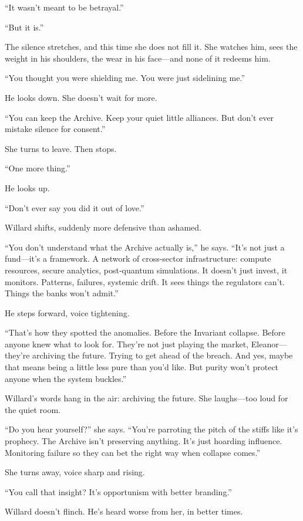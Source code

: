 “It wasn’t meant to be betrayal.”

“But it is.”

The silence stretches, and this time she does not fill it. She watches him, sees the weight in his shoulders, the wear in his face—and none of it redeems him.

“You thought you were shielding me. You were just sidelining me.”

He looks down. She doesn’t wait for more.

“You can keep the Archive. Keep your quiet little alliances. But don’t ever mistake silence for consent.”

She turns to leave. Then stops.

“One more thing.”

He looks up.

“Don’t ever say you did it out of love.”

Willard shifts, suddenly more defensive than ashamed.

“You don’t understand what the Archive actually is,” he says. “It’s not just a fund—it’s a framework. A network of cross-sector infrastructure: compute resources, secure analytics, post-quantum simulations. It doesn’t just invest, it monitors. Patterns, failures, systemic drift. It sees things the regulators can’t. Things the banks won’t admit.”

He steps forward, voice tightening.

“That’s how they spotted the anomalies. Before the Invariant collapse. Before anyone knew what to look for. They’re not just playing the market, Eleanor—they’re archiving the future. Trying to get ahead of the breach. And yes, maybe that means being a little less pure than you'd like. But purity won’t protect anyone when the system buckles.”

Willard’s words hang in the air: archiving the future.
She laughs—too loud for the quiet room.

“Do you hear yourself?” she says. “You’re parroting the pitch of the stiffs like it’s prophecy. The Archive isn’t preserving anything. It’s just hoarding influence. Monitoring failure so they can bet the right way when collapse comes.”

She turns away, voice sharp and rising.

“You call that insight? It’s opportunism with better branding.”

Willard doesn’t flinch. He’s heard worse from her, in better times.

